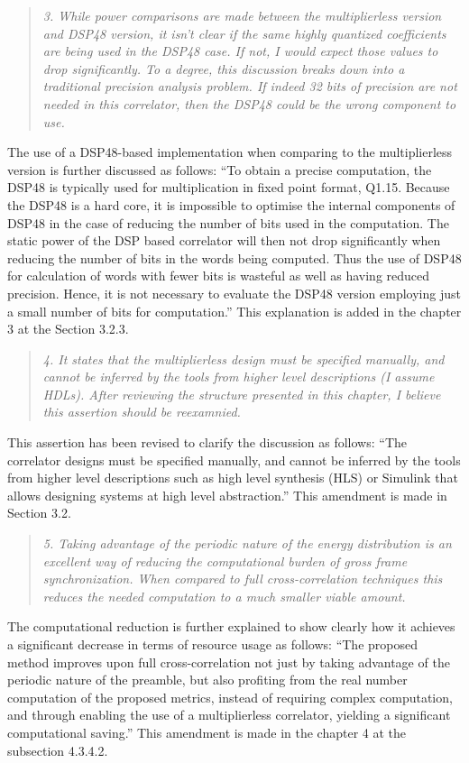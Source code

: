 \documentclass{article}
\begin{document}
\begin{quote}
\emph{3. While power comparisons are made between the multiplierless version and DSP48 version, it isn't clear if the same highly quantized coefficients are being used in the DSP48 case. If not, I would expect those values to drop significantly. To a degree, this discussion breaks down into a traditional precision analysis problem. If indeed 32 bits of precision are not needed in this correlator, then the DSP48 could be the wrong component to use.}
\end{quote}
The use of a DSP48-based implementation when comparing to the multiplierless version is further discussed as follows:
``To obtain a precise computation, the DSP48 is typically used for multiplication in fixed point format, Q1.15. Because the DSP48 is a hard core, it is impossible to optimise the internal components of DSP48 in the case of reducing the number of bits used in the computation. The static power of the DSP based correlator will then not drop significantly when reducing the number of bits in the words being computed. Thus the use of DSP48 for calculation of words with fewer bits is wasteful as well as having reduced precision. Hence, it is not necessary to evaluate the DSP48 version employing just a small number of  bits for computation.''
This explanation is added in the chapter 3 at the Section 3.2.3.

\begin{quote}
\emph{4. It states that the multiplierless design must be specified manually, and cannot be inferred by the tools from higher level descriptions (I assume HDLs). After reviewing the structure presented in this chapter, I believe this assertion should be reexamnied.}
\end{quote}
This assertion has been revised to clarify the discussion as follows:
``The correlator designs must be specified manually, and cannot be inferred by the tools from higher level descriptions such as high level synthesis (HLS) or Simulink that allows designing systems at high level abstraction.''
This amendment is made in Section 3.2.

\begin{quote}
\emph{5. Taking advantage of the periodic nature of the energy distribution is an excellent way of reducing the computational burden of gross frame synchronization. When compared to full cross-correlation techniques this reduces the needed computation to a much smaller viable amount.}
\end{quote}
The computational reduction is further explained to show clearly how it achieves a significant decrease in terms of resource usage as follows:
``The proposed method improves upon full cross-correlation not just by taking advantage of the periodic nature of the preamble, but also profiting from the real number computation of the proposed metrics, instead of requiring complex computation, and through enabling the use of a multiplierless correlator, yielding a significant computational saving.''
This amendment is made in the chapter 4 at the subsection 4.3.4.2.
\end{document}
